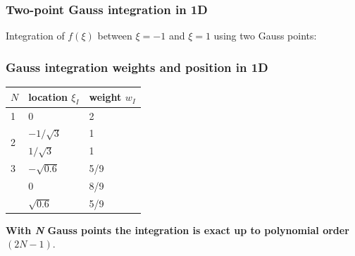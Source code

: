 \documentclass[notes]{beamer}
\begin{document}
\begin{frame}
\frametitle{Two-point Gauss integration in 1D}
Integration of $f(\xi)$ between $\xi = -1$ and $\xi = 1 $ using two Gauss points:
\end{frame}

\begin{frame}
\frametitle{Gauss integration weights and position in 1D}
\begin{table}[!h]
	\begin{tabular}{lll}
		\toprule
		$N$                  & location $\xi_I$ & weight $w_I$ \\
		\midrule
		1                  & 0                &
		2            \\
		\midrule
		\multirow{2}{*}{2} & $-1/\sqrt{3}$    & 1            \\
		& $1/\sqrt{3}$     & 1            \\
		\midrule
		3                  & $-\sqrt{0.6}$    & 5/9          \\
		& 0                & 8/9          \\
		& $\sqrt{0.6}$     & 5/9  		  \\
		\bottomrule       
	\end{tabular}
\end{table}	

\textbf{With \textit{N} Gauss points the integration is exact up to polynomial order $(2N - 1)$}. 

\end{frame}
\end{document}
